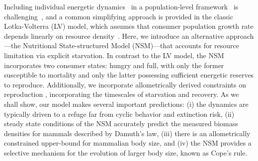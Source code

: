 \documentclass[twocolumn,preprintnumbers,amsmath,amssymb,superscriptaddress]{revtex4}
\begin{document}
Including individual energetic dynamics~\citep{Kooi2000} in a population-level framework~\citep{Kooi2000,Sousa:2010ez} is challenging~\citep{Diekmann:2010da}, and
a common simplifying approach is provided in the classic Lotka-Volterra (LV) model, which assumes that consumer population growth rate depends linearly on resource
  density~\citep{murdoch:2003}. Here, we introduce an alternative
  approach---the Nutritional State-structured Model (NSM)---that accounts for
  resource limitation via explicit starvation. In contrast to
  the LV model, the NSM incorporates two consumer states:
  hungry and full, with only the former susceptible to mortality and only the
  latter possessing sufficient energetic reserves to reproduce.
  Additionally, we incorporate allometrically derived constraints on reproduction \citep{Kempes:2012hy}, incorporating the timescales of starvation and recovery. 
  As we shall show, our model makes several important predictions: 
  (i) the dynamics are typically driven to a refuge far from cyclic behavior and extinction risk, 
  (ii) steady state conditions of the NSM accurately predict the measured biomass densities for mammals described by Damuth's law,
  (iii) there is an allometrically constrained upper-bound for mammalian body size, and
  (iv) the NSM provides a selective mechanism for the evolution of larger body size, known as Cope's rule.


\end{document}
